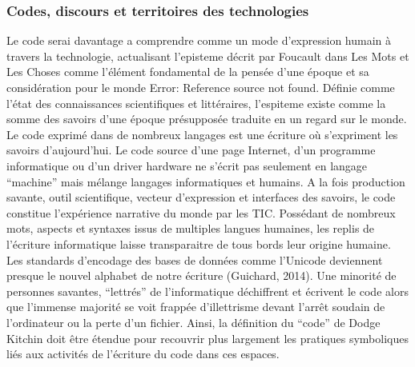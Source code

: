 \subsubsection[Codes, discours et territoires des technologies]{Codes, discours et territoires des technologies}
Le code serai davantage a comprendre comme un mode d’expression humain à travers la technologie, actualisant l’episteme décrit par Foucault dans Les Mots et Les Choses comme l’élément fondamental de la pensée d’une époque et sa considération pour le monde Error: Reference source not found. Définie comme l’état des connaissances scientifiques et littéraires, l’espiteme existe comme la somme des savoirs d’une époque présupposée traduite en un regard sur le monde. Le code exprimé dans de nombreux langages est une écriture où s’expriment les savoirs d’aujourd’hui. Le code source d’une page Internet, d’un programme informatique ou d’un driver hardware ne s’écrit pas seulement en langage “machine” mais mélange langages informatiques et humains. A la fois production savante, outil scientifique, vecteur d’expression et interfaces des savoirs, le code constitue l’expérience narrative du monde par les TIC. Possédant de nombreux mots, aspects et syntaxes issus de multiples langues humaines, les replis de l’écriture informatique laisse transparaitre de tous bords leur origine humaine. Les standards d’encodage des bases de données comme l’Unicode deviennent presque le nouvel alphabet de notre écriture (Guichard, 2014). Une minorité de personnes savantes, “lettrés” de l’informatique déchiffrent et écrivent le code alors que l’immense majorité se voit frappée d’illettrisme devant l’arrêt soudain de l’ordinateur ou la perte d’un fichier. Ainsi, la définition du “code” de Dodge  Kitchin doit être étendue pour recouvrir plus largement les pratiques symboliques liés aux activités de l’écriture du code dans ces espaces.

